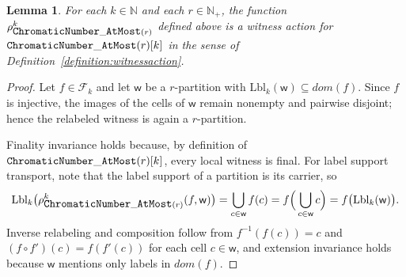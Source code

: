 \documentclass[11pt,a4paper]{article}
\newtheorem{lemma}[theorem]{Lemma}
\newcommand{\treewidthvalue}{k}
\newcommand{\Nplus}{\mathbb{N}_{+}}
\newcommand{\N}{\mathbb{N}}
\newcommand{\awitness}{\mathsf{w}}
\newcommand{\dpNamePart}[1]{\mbox{\normalfont\ttfamily #1}}
\newcommand{\domain}{dom}
\newcommand{\numbercolors}{r}
\newcommand{\chromaticnumberAtMostCore}[1]{\dpNamePart{ChromaticNumber}\_\allowbreak\dpNamePart{AtMost}(#1)}
\newcommand{\relabelingfunction}{f}
\newcommand{\relabelclass}{\mathcal{F}}
\newcommand{\action}{\rho}
\begin{document}
\begin{lemma}
\label{lemma:witness-action-colorability}
For each $\treewidthvalue\in \N$ and each $\numbercolors\in \Nplus$, the function $\action_{\chromaticnumberAtMostCore{\numbercolors}}^\treewidthvalue$ defined above is a witness action for $\chromaticnumberAtMostCore{\numbercolors}[\treewidthvalue]$ in the sense of Definition~\ref{definition:witnessaction}.
\end{lemma}
\begin{proof}
Let $\relabelingfunction\in \relabelclass_\treewidthvalue$ and let $\awitness$ be a $\numbercolors$-partition with $\mathrm{Lbl}_{\treewidthvalue}(\awitness)\subseteq \domain(\relabelingfunction)$. Since $\relabelingfunction$ is injective, the images of the cells of $\awitness$ remain nonempty and pairwise disjoint; hence the relabeled witness is again a $\numbercolors$-partition.

Finality invariance holds because, by definition of $\chromaticnumberAtMostCore{\numbercolors}[\treewidthvalue]$, every local witness is final. For label support transport, note that the label support of a partition is its carrier, so
\[
\mathrm{Lbl}_{\treewidthvalue}\big(\action_{\chromaticnumberAtMostCore{\numbercolors}}^\treewidthvalue(\relabelingfunction,\awitness)\big)
= \bigcup_{c\in \awitness}\relabelingfunction(c)
= \relabelingfunction\Big(\bigcup_{c\in \awitness}c\Big)
= \relabelingfunction\big(\mathrm{Lbl}_{\treewidthvalue}(\awitness)\big).
\]
	Inverse relabeling and composition follow from $\relabelingfunction^{-1}(\relabelingfunction(c))=c$ and $(\relabelingfunction\circ \relabelingfunction')(c)=\relabelingfunction(\relabelingfunction'(c))$ for each cell $c\in \awitness$, and extension invariance holds because $\awitness$ mentions only labels in $\domain(\relabelingfunction)$.


\end{proof}
\end{document}
